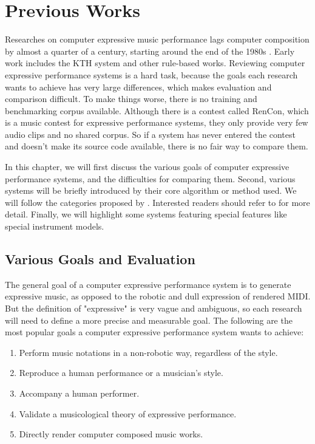 \chapter{Previous Works}
\label{chap:prev}
Researches on computer expressive music performance lags computer composition by almost a quarter of a century, starting around the end of the 1980s \cite{THEBOOK}. Early work includes the KTH system \cite{THEBOOK} and other rule-based works. Reviewing computer expressive performance systems is a hard task, because the goals each research wants to achieve has very large differences, which makes evaluation and comparison difficult. To make things worse, there is no training and benchmarking corpus available. Although there is a contest called RenCon\cite{RenCon}, which is a music contest for expressive performance systems, they only provide very few audio clips and no shared corpus. So if a system has never entered the contest and doesn't make its source code available, there is no fair way to compare them.

In this chapter, we will first discuss the various goals of computer expressive performance systems, and the difficulties for comparing them.  Second, various systems will be briefly introduced by their core algorithm or method used. We will follow the categories proposed by \cite{THEBOOK}. Interested readers should refer to \cite{THEBOOK} for more detail. Finally, we will highlight some systems featuring special features like special instrument models.

\section{Various Goals and Evaluation}
The general goal of a computer expressive performance system is to generate expressive music, as opposed to the robotic and dull expression of rendered MIDI. But the definition of "expressive" is very vague and ambiguous, so each research will need to define a more precise and measurable goal. The following are the most popular goals a computer expressive performance system wants to achieve:
\begin{enumerate}
   \item Perform music notations in a non-robotic way, regardless of the style.
   \item Reproduce a human performance or a musician's style.
   \item Accompany a human performer.
   \item Validate a musicological theory of expressive performance.
   \item Directly render computer composed music works.
\end{enumerate}

